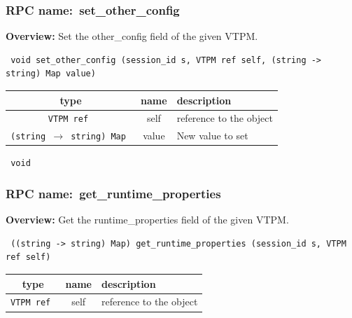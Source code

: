 \subsubsection{RPC name:~set\_other\_config}

{\bf Overview:}
Set the other\_config field of the given VTPM.

\begin{verbatim} void set_other_config (session_id s, VTPM ref self, (string -> string) Map value)\end{verbatim}




\vspace{0.3cm}
\begin{tabular}{|c|c|p{7cm}|}
 \hline
{\bf type} & {\bf name} & {\bf description} \\ \hline
{\tt VTPM ref } & self & reference to the object \\ \hline

{\tt (string $\rightarrow$ string) Map } & value & New value to set \\ \hline

\end{tabular}

\vspace{0.3cm}

{\tt
void
}



\vspace{0.3cm}
\vspace{0.3cm}
\vspace{0.3cm}
\subsubsection{RPC name:~get\_runtime\_properties}

{\bf Overview:}
Get the runtime\_properties field of the given VTPM.

\begin{verbatim} ((string -> string) Map) get_runtime_properties (session_id s, VTPM ref self)\end{verbatim}




\vspace{0.3cm}
\begin{tabular}{|c|c|p{7cm}|}
 \hline
{\bf type} & {\bf name} & {\bf description} \\ \hline
{\tt VTPM ref } & self & reference to the object \\ \hline

\end{tabular}

